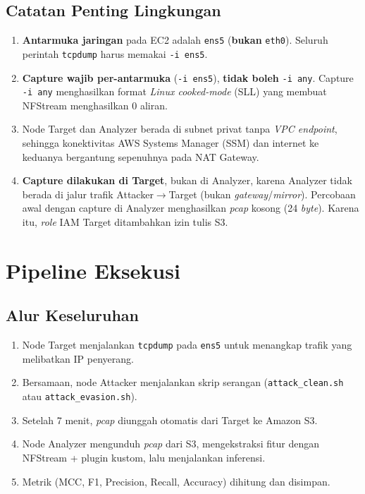 \documentclass[11pt, a4paper]{article}
\begin{document}
\subsection{Catatan Penting Lingkungan}
\begin{enumerate}[leftmargin=1.4cm]
    \item \textbf{Antarmuka jaringan} pada EC2 adalah \texttt{ens5} (\textbf{bukan} \texttt{eth0}). Seluruh perintah \texttt{tcpdump} harus memakai \texttt{-i ens5}.
    \item \textbf{Capture wajib per-antarmuka} (\texttt{-i ens5}), \textbf{tidak boleh} \texttt{-i any}. Capture \texttt{-i any} menghasilkan format \textit{Linux cooked-mode} (SLL) yang membuat NFStream menghasilkan 0 aliran.
    \item Node Target dan Analyzer berada di subnet privat tanpa \textit{VPC endpoint}, sehingga konektivitas AWS Systems Manager (SSM) dan internet ke keduanya bergantung sepenuhnya pada NAT Gateway.
    \item \textbf{Capture dilakukan di Target}, bukan di Analyzer, karena Analyzer tidak berada di jalur trafik Attacker$\to$Target (bukan \textit{gateway}/\textit{mirror}). Percobaan awal dengan capture di Analyzer menghasilkan \textit{pcap} kosong (24 \textit{byte}). Karena itu, \textit{role} IAM Target ditambahkan izin tulis S3.
\end{enumerate}

\section{Pipeline Eksekusi}

\subsection{Alur Keseluruhan}
\begin{enumerate}[leftmargin=1.4cm]
    \item Node Target menjalankan \texttt{tcpdump} pada \texttt{ens5} untuk menangkap trafik yang melibatkan IP penyerang.
    \item Bersamaan, node Attacker menjalankan skrip serangan (\texttt{attack\_clean.sh} atau \texttt{attack\_evasion.sh}).
    \item Setelah 7 menit, \textit{pcap} diunggah otomatis dari Target ke Amazon S3.
    \item Node Analyzer mengunduh \textit{pcap} dari S3, mengekstraksi fitur dengan NFStream + plugin kustom, lalu menjalankan inferensi.
    \item Metrik (MCC, F1, Precision, Recall, Accuracy) dihitung dan disimpan.
\end{enumerate}
\end{document}
